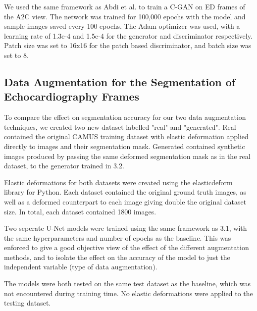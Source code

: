 We used the same framework as Abdi et al. to train a C-GAN on ED frames of the
A2C view. The network was trained for 100,000 epochs with the model and
sample images saved every 100 epochs. The Adam optimizer was used, with a
learning rate of 1.3e-4 and 1.5e-4 for the generator and discriminator
respectively. Patch size was set to 16x16 for the patch based discriminator, and
batch size was set to 8.\newline

\subsection{Data Augmentation for the Segmentation of Echocardiography Frames}

To compare the effect on segmentation accuracy for our two data augmentation
techniques, we created two new dataset labelled "real" and "generated". Real
contained the original CAMUS training dataset with elastic deformation applied
directly to images and their segmentation mask. Generated contained synthetic
images produced by passing the same deformed segmentation mask as in the real
dataset, to the generator trained in 3.2.
\newline

Elastic deformations for both datasets were created using the elasticdeform
library for Python. Each dataset contained the original ground truth images, as well
as a deformed counterpart to each image giving double the original dataset size. In total,
each dataset contained 1800 images. \newline

Two seperate U-Net models were trained using the same framework as 3.1, with the
same hyperparameters and number of epochs as the baseline. This was enforced to
give a good objective view of the effect of the different augmentation methods,
and to isolate the effect on the accuracy of the model to just the independent
variable (type of data augmentation). \newline

The models were both tested on the same test dataset as the baseline, which was
not encountered during training time. No elastic deformations were applied to
the testing dataset. 